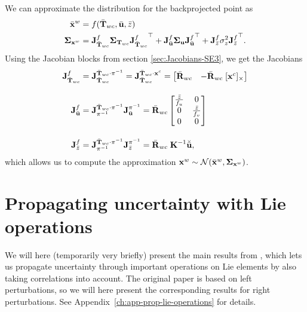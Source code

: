 \begin{example}[frametitle=Uncertainty in backprojection]
We can approximate the distribution for the backprojected point as
\begin{align}
  \bar{\vecx}^w &= f(\bar{\matT}_{wc}, \bar{\vecu}, \bar{z}) \label{eq:est_x}\\
  \matSigma_{\vecx^w} &= \jac{f}{\bar{\matT}_{wc}} \matSigma_{\matT_{wc}} {\jac{f}{\bar{\matT}_{wc}}}\trans +
  \jac{f}{\bar{\vecu}} \matSigma_{\vecu} \jac{f}{\bar{\vecu}}\trans +
  \jac{f}{\bar{z}} \sigma^2_z {\jac{f}{\bar{z}}}\trans. \label{eq:est_S}
\end{align}
Using the Jacobian blocks from section \ref{sec:Jacobians-SE3}, we get the Jacobians
\begin{align}
  \jac{f}{\bar{\matT}_{wc}} &= \jac{\bar{\matT}_{wc} \cdot \pi^{-1}}{\bar{\matT}_{wc}} = \jac{\bar{\matT}_{wc} \cdot \vecx^c}{\bar{\matT}_{wc}} = 
  \begin{bmatrix}
    \bar{\matR}_{wc} & -\bar{\matR}_{wc} \; [\vecx^c]_\times
  \end{bmatrix}\\[1em]
  \jac{f}{\bar{\vecu}} &= \jac{\bar{\matT}_{wc} \cdot \pi^{-1}}{\pi^{-1}} \jac{\pi^{-1}}{\bar{\vecu}} = \bar{\matR}_{wc}
    \begin{bmatrix}
    \frac{\bar{z}}{f_u} & 0\\
    0 & \frac{\bar{z}}{f_v}\\
    0 & 0
  \end{bmatrix}\\[1em]
  \jac{f}{\bar{z}} &= \jac{\bar{\matT}_{wc} \cdot \pi^{-1}}{\pi^{-1}} \jac{\pi^{-1}}{\bar{z}} = \bar{\matR}_{wc} \; \matK^{-1} \breve{\bar{\vecu}},
\end{align}
which allows us to compute the approximation $\vecx^w \sim \cN(\bar{\vecx}^w, \matSigma_{\vecx^w})$.
\end{example}

\section{Propagating uncertainty with Lie operations}
We will here (temporarily very briefly) present the main results from \cite{Mangelson2020CharacterizingAlgebra}, which lets us propagate uncertainty through important operations on Lie elements by also taking correlations into account.
The original paper is based on left perturbations, so we will here present the corresponding results for right perturbations.
See Appendix~\ref{ch:app-prop-lie-operations} for details.

